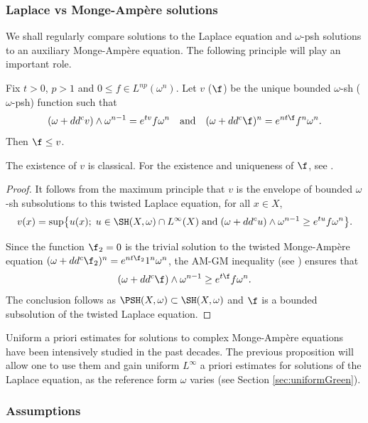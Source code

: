 \subsubsection{Laplace vs Monge-Ampère solutions} \label{sec:LaplacevsMA}

We shall regularly compare solutions to the Laplace equation
and $\omega$-psh solutions to an auxiliary Monge-Ampère equation.
The following principle will play an important role.

\begin{prop} \label{pro:comparisonLMA}
Fix $t>0$, $p>1$ and $0 \leq f \in L^{np}(\omega^n)$. Let $v$ (\resp $\f$) be the unique bounded $\omega$-sh (\resp $\omega$-psh)
function such that
\[
(\omega+dd^c v) \wedge \omega^{n-1}=e^{tv} f \omega^n
\quad \text{and} \quad
(\omega+dd^c \f)^n = e^{nt\f} f^n \omega^n.
\]
Then $\f \leq v$.
\end{prop}

The existence of $v$ is classical.
For the existence and uniqueness of $\f$, see \cite{GZbook}.

\begin{proof}
It follows from the maximum principle that $v$ is the envelope of bounded $\omega$-sh subsolutions to this twisted Laplace equation, \ie for all $x \in X$,
\[
v(x)=\sup \bigl\{ u(x); \; u \in \SH(X,\omega) \cap L^{\infty}(X)
\; \text{and} \;
(\omega+dd^c u) \wedge \omega^{n-1} \geq e^{tu} f \omega^n \bigr\}.
\]

Since the function $\f_2=0$ is the trivial solution to the twisted Monge-Ampère equation
$(\omega+dd^c \f_2)^n = e^{nt\f_2} 1^n \omega^n$,
the AM-GM inequality (see \cite[Th.\,2.12]{DK14}) ensures that
\[
(\omega+dd^c \f) \wedge \omega^{n-1} \geq e^{t \f} f \omega^n.
\]
The conclusion follows as $\PSH(X,\omega) \subset \SH(X,\omega)$
and $\f$ is a bounded subsolution of the twisted Laplace equation.
\end{proof}

Uniform a priori estimates for solutions to complex Monge-Ampère equations
have been intensively studied in the past decades. The previous proposition
will allow one to use them and gain uniform $L^{\infty}$ a priori estimates
for solutions of the Laplace equation, as the reference form $\omega$ varies
(see Section \ref{sec:uniformGreen}).

 \label{sec:uniformMA}

\subsubsection{Assumptions}

